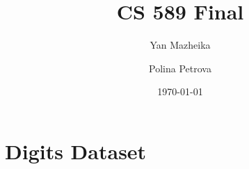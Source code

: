 \documentclass{article}
\title{CS 589 Final}
\author{Yan Mazheika \and Polina Petrova}
\date{\today}
\begin{document}
\maketitle

\section*{Digits Dataset}
\end{document}

